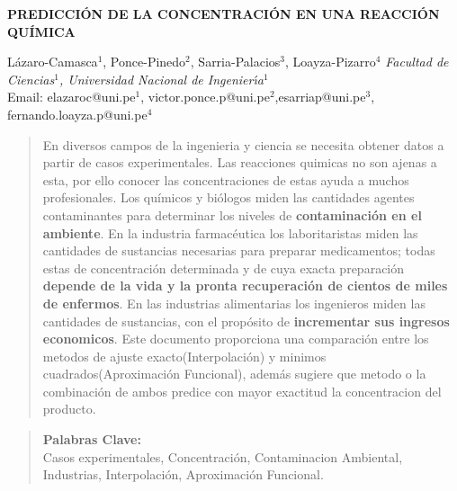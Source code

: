 \documentclass[10pt,a4paper]{article}
\begin{document}
\begin{center}
 {\Large \textbf{PREDICCIÓN DE LA CONCENTRACIÓN EN UNA REACCIÓN QUÍMICA}}
\end{center}
\begin{center}
 Lázaro-Camasca$^{1}$, Ponce-Pinedo$^{2}$, Sarria-Palacios$^{3}$, Loayza-Pizarro$^{4}$\vskip5pt
 {\it Facultad de Ciencias$^1$, Universidad Nacional de Ingenier\'{\i}a$^1$\\}\vskip5pt
 Email: elazaroc@uni.pe$^{1}$, victor.ponce.p@uni.pe$^{2}$,esarriap@uni.pe$^{3}$, fernando.loayza.p@uni.pe$^{4}$
\end{center}
\vspace*{0.4cm}

\begin{abstract}

En diversos campos de la ingenieria y ciencia se necesita obtener datos a partir de casos experimentales. Las reacciones quimicas no son ajenas a esta, por ello conocer las concentraciones de estas ayuda a muchos profesionales. Los químicos y biólogos miden las cantidades agentes contaminantes para determinar los niveles de \textbf{contaminación en el ambiente}. En la industria farmacéutica los laboritaristas miden las cantidades de sustancias necesarias para preparar medicamentos; todas estas de concentración determinada y de cuya exacta preparación \textbf{depende de la vida y la pronta recuperación de cientos de miles de enfermos}. En las industrias alimentarias los ingenieros miden las cantidades de sustancias, con el propósito de \textbf{incrementar sus ingresos economicos}. Este documento proporciona una comparación entre los metodos de ajuste exacto(Interpolación) y minimos cuadrados(Aproximación Funcional), además sugiere que metodo o la combinación de ambos predice con mayor exactitud la concentracion del producto.

\end{abstract}


\begin{quotation}
	{\small
		\noindent\textbf{Palabras Clave:} \\ 
	Casos experimentales, Concentración, Contaminacion Ambiental, Industrias, Interpolación, Aproximación Funcional.
	 }
\end{quotation}


\renewcommand{\abstractname}{Abstract}
\end{document}
